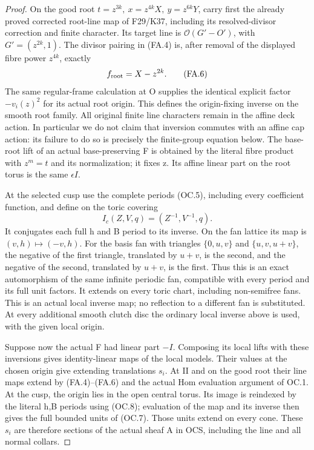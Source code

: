 \begin{proof}
On the good root \(t=z^{3k},\ x=z^{4k}X,\ y=z^{6k}Y\), carry first the already proved corrected root-line map of F29/K37,
including its resolved-divisor correction and finite character. Its target
line is \(\mathcal O(G'-O')\), with \(G'=(z^{2k},1)\). The divisor pairing in (FA.4)
is, after removal of the displayed fibre power \(z^{4k}\), exactly
\[
                            f_{\rm root}=X-z^{2k}.        \tag{FA.6}
\]
The same regular-frame calculation at O supplies the identical
explicit factor \(-v_i(z)^2\) for its actual root origin. This defines
the origin-fixing inverse on the smooth root family. All original
finite line characters remain in the affine deck action. In particular
we do not claim that inversion commutes with an affine cap action: its
failure to do so is precisely the finite-group equation below. The
base-root lift of an actual base-preserving F is obtained by the literal
fibre product with \(z^m=t\) and its normalization; it fixes z. Its affine
linear part on the root torus is the same \(\epsilon I\).

At the selected cusp use the complete periods (OC.5), including every
coefficient function, and define on the toric covering
\[
                   I_c(Z,V,q)=(Z^{-1},V^{-1},q).           \tag{FA.7}
\]
It conjugates each full h and B period to its inverse. On the fan lattice
its map is \((v,h)\mapsto(-v,h)\). For the basis fan with triangles
\(\{0,u,v\}\) and \(\{u,v,u+v\}\), the negative of the first triangle, translated by
\(u+v\), is the second, and the negative of the second, translated by \(u+v\),
is the first. Thus this is an exact automorphism of the same infinite
periodic fan, compatible with every period and its full unit factors.
It extends on every toric chart, including non-semifree fans. This is an
actual local inverse map; no reflection to a different fan is substituted.
At every additional smooth clutch disc the ordinary local inverse above
is used, with the given local origin.

Suppose now the actual F had linear part \(-I\). Composing its local lifts
with these inversions gives identity-linear maps of the local models.
Their values at the chosen origin give extending translations \(s_i\). At
II and on the good root their line maps extend by (FA.4)--(FA.6) and the
actual Hom evaluation argument of OC.1. At the cusp, the origin lies in
the open central torus. Its image is reindexed by the literal h,B periods
using (OC.8); evaluation of the map and its inverse then gives the full
bounded units of (OC.7). Those units extend on every cone. These \(s_i\) are
therefore sections of the actual sheaf A in OCS, including the line and
all normal collars.


\end{proof}
